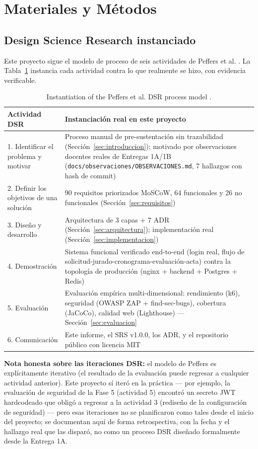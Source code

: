 \section{Materiales y Métodos}
\label{sec:metodos}

\subsection{Design Science Research instanciado}

Este proyecto sigue el modelo de proceso de seis actividades de Peffers et al. \cite{peffers2007}. La
Tabla~\ref{tab:dsr} instancia cada actividad contra lo que realmente se hizo, con evidencia verificable.

\begin{table}[H]
\centering
\small
\begin{tabular}{p{2.6cm}p{9.5cm}}
\toprule
\textbf{Actividad DSR} & \textbf{Instanciación real en este proyecto} \\
\midrule
1. Identificar el problema y motivar & Proceso manual de pre-sustentación sin trazabilidad (Sección~\ref{sec:introduccion}); motivado por observaciones docentes reales de Entregas 1A/1B (\texttt{docs/observaciones/OBSERVACIONES.md}, 7 hallazgos con hash de commit) \\
2. Definir los objetivos de una solución & 90 requisitos priorizados MoSCoW, 64 funcionales y 26 no funcionales (Sección~\ref{sec:requisitos}) \\
3. Diseño y desarrollo & Arquitectura de 3 capas + 7 ADR (Sección~\ref{sec:arquitectura}); implementación real (Sección~\ref{sec:implementacion}) \\
4. Demostración & Sistema funcional verificado end-to-end (login real, flujo de solicitud-jurado-cronograma-evaluación-acta) contra la topología de producción (nginx + backend + Postgres + Redis) \\
5. Evaluación & Evaluación empírica multi-dimensional: rendimiento (k6), seguridad (OWASP ZAP + find-sec-bugs), cobertura (JaCoCo), calidad web (Lighthouse) --- Sección~\ref{sec:evaluacion} \\
6. Comunicación & Este informe, el SRS v1.0.0, los ADR, y el repositorio público con licencia MIT \\
\bottomrule
\end{tabular}
\caption{Instantiation of the Peffers et al. DSR process model \cite{peffers2007}.}
\label{tab:dsr}
\end{table}

\textbf{Nota honesta sobre las iteraciones DSR:} el modelo de Peffers es explícitamente iterativo (el
resultado de la evaluación puede regresar a cualquier actividad anterior). Este proyecto sí iteró en la
práctica --- por ejemplo, la evaluación de seguridad de la Fase 5 (actividad 5) encontró un secreto JWT
hardcodeado que obligó a regresar a la actividad 3 (rediseño de la configuración de seguridad) --- pero
esas iteraciones no se planificaron como tales desde el inicio del proyecto; se documentan aquí de forma
retrospectiva, con la fecha y el hallazgo real que las disparó, no como un proceso DSR diseñado
formalmente desde la Entrega 1A.

